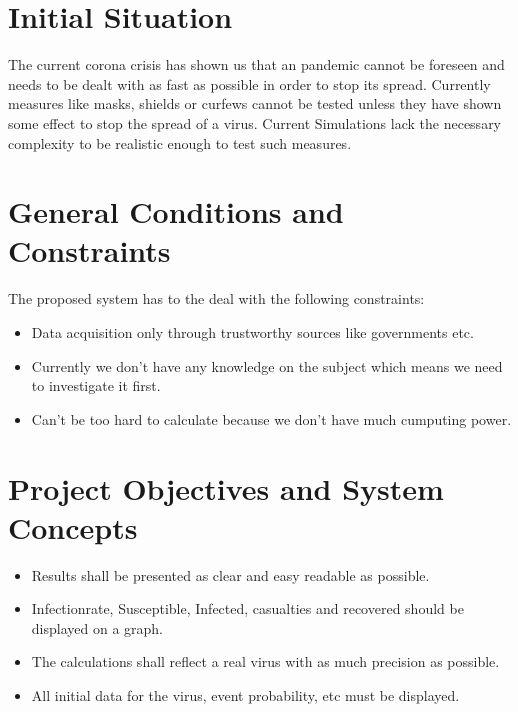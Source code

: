 \documentclass[12pt]{article}
\theoremstyle{definition}
\begin{document}
\pagebreak

\section{Initial Situation}

The current corona crisis has shown us that an pandemic cannot be foreseen and needs to be dealt with as fast as possible in order to stop its spread.
Currently measures like masks, shields or curfews cannot be tested unless they have shown some effect to stop the spread of a virus.
Current Simulations lack the necessary complexity to be realistic enough to test such measures.

\pagebreak

\section{General Conditions and Constraints}

The proposed system has to the deal with the following constraints:

\begin{itemize}
\item Data acquisition only through trustworthy sources like governments etc.
\item Currently we don't have any knowledge on the subject which means we need to investigate it first.
\item Can't be too hard to calculate because we don't have much cumputing power.
\end{itemize}

\pagebreak

\section{Project Objectives and System Concepts}

\begin{itemize}
\item Results shall be presented as clear and easy readable as possible.
\item Infectionrate, Susceptible, Infected, casualties and recovered should be displayed on a graph.
\item The calculations shall reflect a real virus with as much precision as possible.
\item All initial data for the virus, event probability, etc must be displayed.
\end{itemize}

\pagebreak
\end{document}
